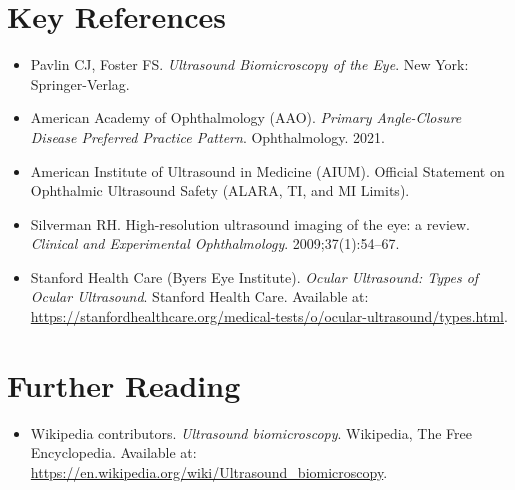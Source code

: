 \section{Key References}

\begin{itemize}
    \item Pavlin CJ, Foster FS. \textit{Ultrasound Biomicroscopy of the Eye}. New York: Springer-Verlag.
    \item American Academy of Ophthalmology (AAO). \textit{Primary Angle-Closure Disease Preferred Practice Pattern}. Ophthalmology. 2021.
    \item American Institute of Ultrasound in Medicine (AIUM). Official Statement on Ophthalmic Ultrasound Safety (ALARA, TI, and MI Limits).
    \item Silverman RH. High-resolution ultrasound imaging of the eye: a review. \textit{Clinical and Experimental Ophthalmology}. 2009;37(1):54--67.
    \item Stanford Health Care (Byers Eye Institute). \textit{Ocular Ultrasound: Types of Ocular Ultrasound}. Stanford Health Care. Available at: \url{https://stanfordhealthcare.org/medical-tests/o/ocular-ultrasound/types.html}.
\end{itemize}

\section{Further Reading}
\begin{itemize}
  \item Wikipedia contributors. \textit{Ultrasound biomicroscopy}. Wikipedia, The Free Encyclopedia. Available at: \url{https://en.wikipedia.org/wiki/Ultrasound_biomicroscopy}.
\end{itemize}
